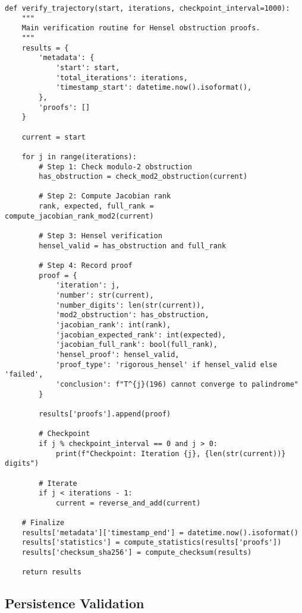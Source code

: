 \documentclass[11pt,a4paper]{article}
\begin{document}
\begin{lstlisting}[style=pythonstyle, caption={Main Verification Loop}]
def verify_trajectory(start, iterations, checkpoint_interval=1000):
    """
    Main verification routine for Hensel obstruction proofs.
    """
    results = {
        'metadata': {
            'start': start,
            'total_iterations': iterations,
            'timestamp_start': datetime.now().isoformat(),
        },
        'proofs': []
    }
    
    current = start
    
    for j in range(iterations):
        # Step 1: Check modulo-2 obstruction
        has_obstruction = check_mod2_obstruction(current)
        
        # Step 2: Compute Jacobian rank
        rank, expected, full_rank = compute_jacobian_rank_mod2(current)
        
        # Step 3: Hensel verification
        hensel_valid = has_obstruction and full_rank
        
        # Step 4: Record proof
        proof = {
            'iteration': j,
            'number': str(current),
            'number_digits': len(str(current)),
            'mod2_obstruction': has_obstruction,
            'jacobian_rank': int(rank),
            'jacobian_expected_rank': int(expected),
            'jacobian_full_rank': bool(full_rank),
            'hensel_proof': hensel_valid,
            'proof_type': 'rigorous_hensel' if hensel_valid else 'failed',
            'conclusion': f"T^{j}(196) cannot converge to palindrome"
        }
        
        results['proofs'].append(proof)
        
        # Checkpoint
        if j % checkpoint_interval == 0 and j > 0:
            print(f"Checkpoint: Iteration {j}, {len(str(current))} digits")
        
        # Iterate
        if j < iterations - 1:
            current = reverse_and_add(current)
    
    # Finalize
    results['metadata']['timestamp_end'] = datetime.now().isoformat()
    results['statistics'] = compute_statistics(results['proofs'])
    results['checksum_sha256'] = compute_checksum(results)
    
    return results
\end{lstlisting}

\subsection{Persistence Validation}
\end{document}
